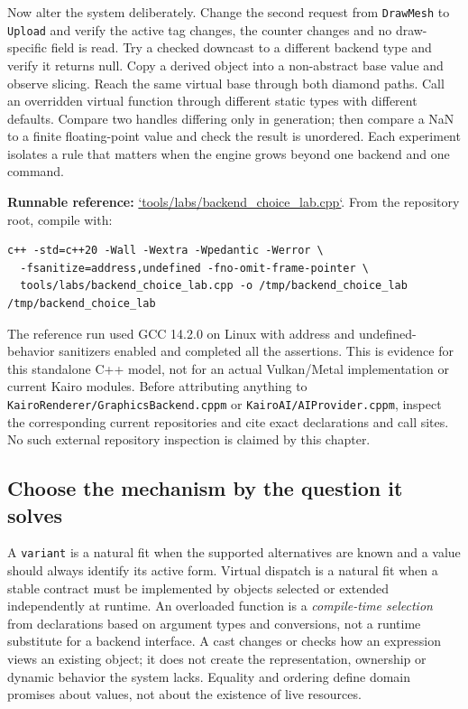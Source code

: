 Now alter the system deliberately. Change the second request from \texttt{DrawMesh} to \texttt{Upload} and verify the active tag changes, the counter changes and no draw-specific field is read. Try a checked downcast to a different backend type and verify it returns null. Copy a derived object into a non-abstract base value and observe slicing. Reach the same virtual base through both diamond paths. Call an overridden virtual function through different static types with different defaults. Compare two handles differing only in generation; then compare a NaN to a finite floating-point value and check the result is unordered. Each experiment isolates a rule that matters when the engine grows beyond one backend and one command.

\textbf{Runnable reference:} \hyperref[source-file-9e5ff4ba88e6efabc938832a]{`tools/labs/backend\_choice\_lab.cpp`}. From the repository root, compile with:

\begin{verbatim}
c++ -std=c++20 -Wall -Wextra -Wpedantic -Werror \
  -fsanitize=address,undefined -fno-omit-frame-pointer \
  tools/labs/backend_choice_lab.cpp -o /tmp/backend_choice_lab
/tmp/backend_choice_lab
\end{verbatim}

The reference run used GCC 14.2.0 on Linux with address and undefined-behavior sanitizers enabled and completed all the assertions. This is evidence for this standalone C++ model, not for an actual Vulkan/Metal implementation or current Kairo modules. Before attributing anything to \texttt{KairoRenderer/GraphicsBackend.cppm} or \texttt{KairoAI/AIProvider.cppm}, inspect the corresponding current repositories and cite exact declarations and call sites. No such external repository inspection is claimed by this chapter.

\subsection{Choose the mechanism by the question it solves}\label{05-engine-i-ch004-choose-the-mechanism-by-the-question-it-solves}

\hypertarget{05-engine-i-ch004-choose-the-mechanism-by-the-question-it-solves}{}

A \texttt{variant} is a natural fit when the supported alternatives are known and a value should always identify its active form. Virtual dispatch is a natural fit when a stable contract must be implemented by objects selected or extended independently at runtime. An overloaded function is a \emph{compile-time selection} from declarations based on argument types and conversions, not a runtime substitute for a backend interface. A cast changes or checks how an expression views an existing object; it does not create the representation, ownership or dynamic behavior the system lacks. Equality and ordering define domain promises about values, not about the existence of live resources.

